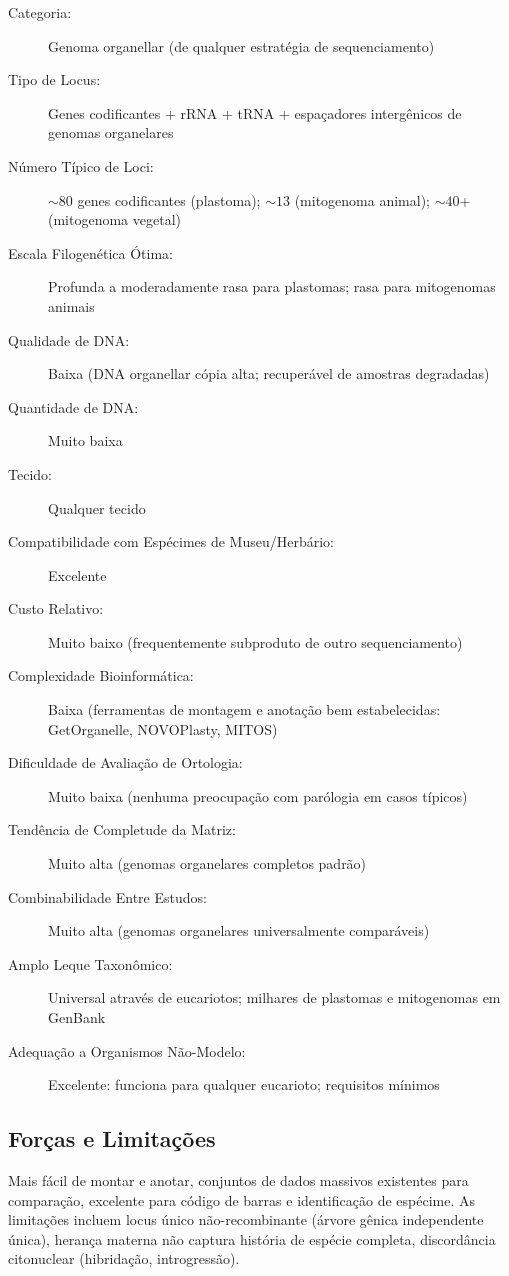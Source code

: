 \begin{description}
\item[Categoria:] Genoma organellar (de qualquer estratégia de sequenciamento)
\item[Tipo de Locus:] Genes codificantes + rRNA + tRNA + espaçadores intergênicos de genomas organelares
\item[Número Típico de Loci:] \(\sim 80\) genes codificantes (plastoma); \(\sim 13\) (mitogenoma animal); \(\sim 40\)+ (mitogenoma vegetal)
\item[Escala Filogenética Ótima:] Profunda a moderadamente rasa para plastomas; rasa para mitogenomas animais
\item[Qualidade de DNA:] Baixa (DNA organellar cópia alta; recuperável de amostras degradadas)
\item[Quantidade de DNA:] Muito baixa
\item[Tecido:] Qualquer tecido
\item[Compatibilidade com Espécimes de Museu/Herbário:] Excelente
\item[Custo Relativo:] Muito baixo (frequentemente subproduto de outro sequenciamento)
\item[Complexidade Bioinformática:] Baixa (ferramentas de montagem e anotação bem estabelecidas: GetOrganelle, NOVOPlasty, MITOS)
\item[Dificuldade de Avaliação de Ortologia:] Muito baixa (nenhuma preocupação com parólogia em casos típicos)
\item[Tendência de Completude da Matriz:] Muito alta (genomas organelares completos padrão)
\item[Combinabilidade Entre Estudos:] Muito alta (genomas organelares universalmente comparáveis)
\item[Amplo Leque Taxonômico:] Universal através de eucariotos; milhares de plastomas e mitogenomas em GenBank
\item[Adequação a Organismos Não-Modelo:] Excelente: funciona para qualquer eucarioto; requisitos mínimos
\end{description}

\subsection{Forças e Limitações}

Mais fácil de montar e anotar, conjuntos de dados massivos existentes para comparação, excelente para código de barras e identificação de espécime. As limitações incluem locus único não-recombinante (árvore gênica independente única), herança materna não captura história de espécie completa, discordância citonuclear (hibridação, introgressão).

